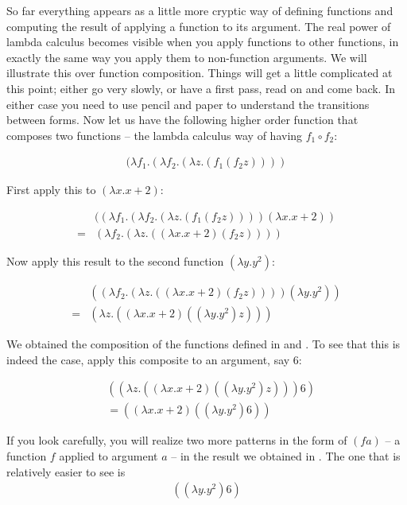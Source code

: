 \documentclass[11pt]{article}
\begin{document}
So far everything appears as a little more cryptic way of defining functions and computing the result of applying a function to its argument. The real power of lambda calculus becomes visible when you apply functions to other functions, in exactly the same way you apply them to non-function arguments. We will illustrate this over function composition. Things will get a little complicated at this point; either go very slowly, or have a first pass, read on and come back. In either case you need to use pencil and paper to understand the transitions between forms.  Now let us have the following higher order function that composes two functions -- the lambda calculus way of having $f_1\circ f_2$:

\begin{align}
(\lambda f_1.(\lambda f_2.(\lambda z.(f_1(f_2z))))
\end{align}

First apply this to $(\lambda x. x + 2)$:

\begin{align}
& ((\lambda f_1.(\lambda f_2.(\lambda z.(f_1(f_2z)))) (\lambda x. x +2))\\
=& (\lambda f_2.(\lambda z.((\lambda x. x +2)(f_2z)))) \nonumber
\end{align}

Now apply this result to the second function $(\lambda y. y^2)$:

\begin{align}
&  ((\lambda f_2.(\lambda z.((\lambda x. x +2)(f_2z))))(\lambda y. y^2)) \\
=& (\lambda z.((\lambda x. x+2)((\lambda y. y^2)z))) \nonumber
\end{align}

We obtained the composition of the functions defined in  and . To see that this is indeed the case, apply this composite to an argument, say 6:

\begin{align}
\label{faint} & ((\lambda z.((\lambda x. x+2)((\lambda y. y^2)z))) 6)\\
&=  ((\lambda x. x+2)((\lambda y. y^2)6))\nonumber 
\end{align}

If you look carefully, you will realize two more patterns in the form of $(f a)$ -- a function $f$ applied to argument $a$ -- in the result we obtained in . The one that is relatively easier to see is  
\begin{align}
\label{occ1} ((\lambda y. y^2)6)
\end{align}
\end{document}

